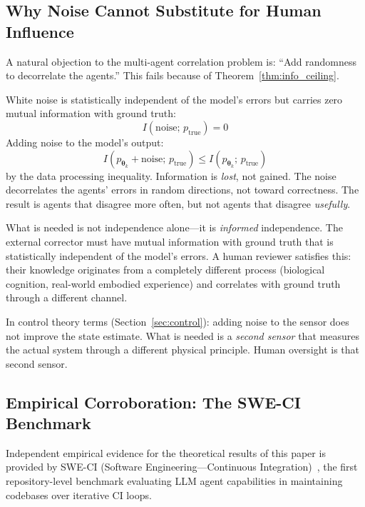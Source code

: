 \documentclass[11pt,a4paper]{article}
\begin{document}
\subsection{Why Noise Cannot Substitute for Human Influence}
\label{sec:noise}

A natural objection to the multi-agent correlation problem is: ``Add randomness to decorrelate the agents.'' This fails because of Theorem~\ref{thm:info_ceiling}.

White noise is statistically independent of the model's errors but carries zero mutual information with ground truth:
\begin{equation}
I(\text{noise};\, p_{\mathrm{true}}) = 0
\end{equation}
Adding noise to the model's output:
\begin{equation}
I(p_{\bm{\theta}_k} + \text{noise};\, p_{\mathrm{true}}) \leq I(p_{\bm{\theta}_k};\, p_{\mathrm{true}})
\end{equation}
by the data processing inequality. Information is \emph{lost}, not gained. The noise decorrelates the agents' errors in random directions, not toward correctness. The result is agents that disagree more often, but not agents that disagree \emph{usefully}.

What is needed is not independence alone---it is \emph{informed} independence. The external corrector must have mutual information with ground truth that is statistically independent of the model's errors. A human reviewer satisfies this: their knowledge originates from a completely different process (biological cognition, real-world embodied experience) and correlates with ground truth through a different channel.

In control theory terms (Section~\ref{sec:control}): adding noise to the sensor does not improve the state estimate. What is needed is a \emph{second sensor} that measures the actual system through a different physical principle. Human oversight is that second sensor.

\subsection{Empirical Corroboration: The SWE-CI Benchmark}
\label{sec:sweci}

Independent empirical evidence for the theoretical results of this paper is provided by SWE-CI (Software Engineering---Continuous Integration)~\cite{chen2025sweci}, the first repository-level benchmark evaluating LLM agent capabilities in maintaining codebases over iterative CI loops.
\end{document}
